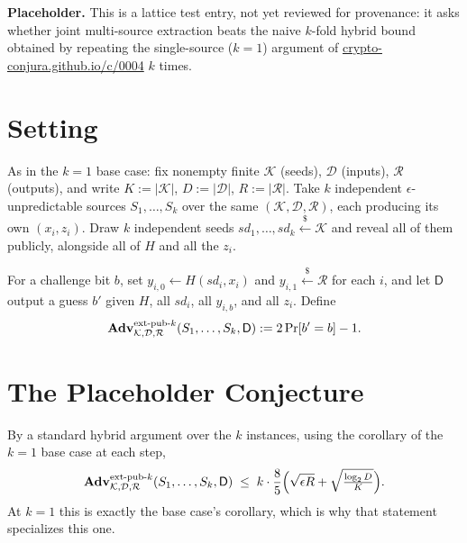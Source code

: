 \documentclass{conjura-conjecture}
\newcommand{\calK}{\mathcal{K}}
\newcommand{\calD}{\mathcal{D}}
\newcommand{\calR}{\mathcal{R}}
\newcommand{\Adv}{\mathbf{Adv}}
\newcommand{\sd}{\mathit{sd}}
\newcommand{\extpubk}{\textup{ext-pub-}k}
\begin{document}

\vspace{0.4em}

\noindent\textbf{Placeholder.} This is a lattice test entry, not yet reviewed for provenance: it asks
whether joint multi-source extraction beats the naive $k$-fold hybrid bound obtained by repeating the
single-source ($k=1$) argument of
\href{https://crypto-conjura.github.io/c/0004/}{crypto-conjura.github.io/c/0004} $k$ times.

\section{Setting}

As in the $k=1$ base case: fix nonempty finite $\calK$ (seeds), $\calD$ (inputs), $\calR$ (outputs),
and write $K := |\calK|$, $D := |\calD|$, $R := |\calR|$. Take $k$ independent
$\epsilon$-unpredictable sources $S_1, \dots, S_k$ over the same $(\calK,\calD,\calR)$, each producing
its own $(x_i, z_i)$. Draw $k$ independent seeds $\sd_1, \dots, \sd_k \stackrel{\$}{\leftarrow} \calK$
and reveal all of them publicly, alongside all of $H$ and all the $z_i$.

\begin{definition}
For a challenge bit $b$, set $y_{i,0} \leftarrow H(\sd_i, x_i)$ and
$y_{i,1} \stackrel{\$}{\leftarrow} \calR$ for each $i$, and let $\mathsf{D}$ output a guess $b'$ given
$H$, all $\sd_i$, all $y_{i,b}$, and all $z_i$. Define
\[
  \Adv^{\extpubk}_{\calK,\calD,\calR}(S_1,\dots,S_k,\mathsf{D}) := 2\Pr[b'=b] - 1 .
\]
\end{definition}

\section{The Placeholder Conjecture}

\begin{proposition}
By a standard hybrid argument over the $k$ instances, using the corollary of the $k=1$ base case at
each step,
\[
  \Adv^{\extpubk}_{\calK,\calD,\calR}(S_1,\dots,S_k,\mathsf{D})
  \;\le\; k \cdot \frac{8}{5}\Bigl( \sqrt{\epsilon R} + \sqrt{\tfrac{\log_2 D}{K}} \Bigr) .
\]
At $k=1$ this is exactly the base case's corollary, which is why that statement specializes this one.
\end{proposition}
\end{document}
